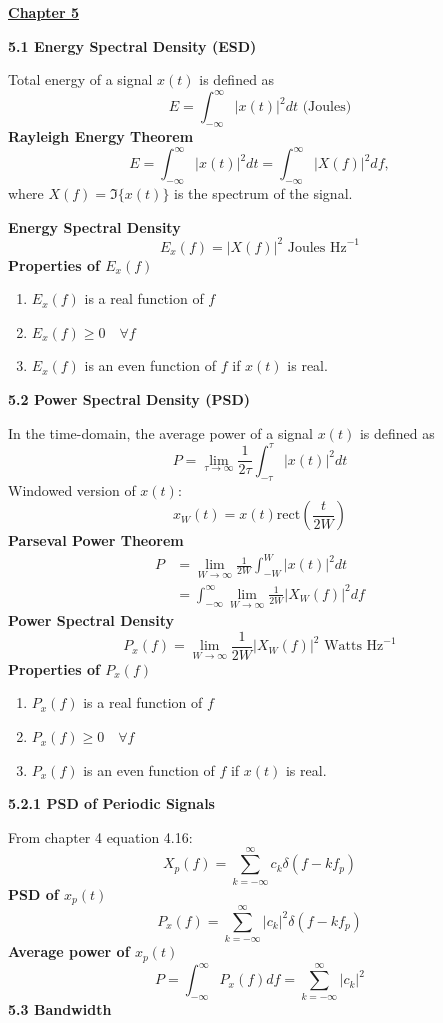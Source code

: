 \documentclass[landscape,a4paper]{extarticle}
\begin{document}
\begin{multicols*}{5}
    \textbf{\uline{Chapter 5}}

    \textbf{5.1 Energy Spectral Density (ESD)}

    Total energy of a signal $x(t)$ is defined as 
    \[
        E=\int_{-\infty}^{\infty}|x(t)|^2 dt \text{ (Joules)} \tag{5.1}
    \]
    \textbf{Rayleigh Energy Theorem}
    \[
        E=\int_{-\infty}^{\infty}|x(t)|^2dt=\int_{-\infty}^{\infty}|X(f)|^2df \tag{5.2},
    \]
    where $X(f)=\Im\{x(t)\}$ is the spectrum of the signal.

    \textbf{Energy Spectral Density}
    \[
        E_x(f)=|X(f)|^2 \text{ Joules Hz}^{-1}\tag{5.3}
    \]
    \textbf{Properties of $E_x(f)$}
    \begin{enumerate}
        \item $E_x(f)$ is a real function of $f$
        \item $E_x(f) \geq 0 \quad\forall f$
        \item $E_x(f)$ is an even function of $f$ if $x(t)$ is real.
    \end{enumerate}

    \textbf{5.2 Power Spectral Density (PSD)}

    In the time-domain, the average power of a signal $x(t)$ is defined as 
    \[
        P=\lim_{\tau \to \infty} \frac{1}{2\tau}\int_{-\tau}^{\tau}|x(t)|^2 dt \tag{5.4}
    \]
    Windowed version of $x(t)$:
    \[
        x_W(t)=x(t)\text{rect}\left(\frac{t}{2W}\right) \tag{5.5}
    \]
    \textbf{Parseval Power Theorem}
    \begin{align*}
        P&=\lim_{W \to \infty}\frac{1}{2W}\int_{-W}^{W}|x(t)|^2dt\\
        &=\int_{-\infty}^{\infty}\lim_{W \to \infty}\frac{1}{2W}|X_W(f)|^2df \tag{5.9}
    \end{align*}
    \textbf{Power Spectral Density}
    \[
        {P_x(f)=\lim_{W \to \infty}\frac{1}{2W}|X_W(f)|^2} \text{ Watts Hz}^{-1} \tag{5.10}
    \]
    \textbf{Properties of $P_x(f)$}
    \begin{enumerate}
        \item $P_x(f)$ is a real function of $f$
        \item $P_x(f) \geq 0 \quad \forall f$
        \item $P_x(f)$ is an even function of $f$ if $x(t)$ is real.
    \end{enumerate}

    \textbf{5.2.1 PSD of Periodic Signals}

    From chapter 4 equation 4.16:
    \[
        X_p(f)=\sum_{k=-\infty}^{\infty}c_k \delta (f-kf_p)
    \]
    \textbf{PSD of $x_p(t)$}
    \[
        P_x(f)=\sum_{k=-\infty}^{\infty}|c_k|^2\delta (f-kf_p) \tag{5.12}
    \]
    \textbf{Average power of $x_p(t)$}
    \[
        P=\int_{-\infty}^{\infty}P_x(f)df=\sum_{k=-\infty}^{\infty}|c_k|^2 \tag{5.13}
    \]
    \textbf{5.3 Bandwidth}


\end{multicols*}
\end{document}
